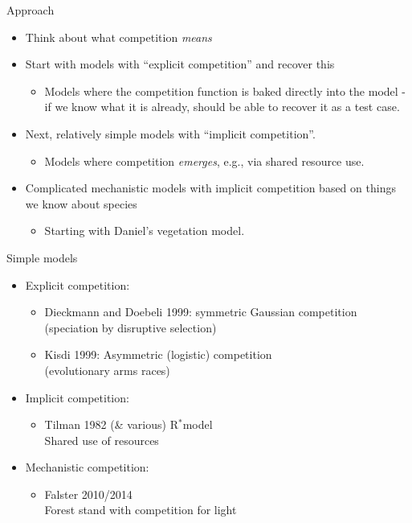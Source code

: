 \documentclass[12pt]{beamer}
\newcommand{\Rstar}{R$^*$}
\begin{document}
\begin{frame}[t]{Approach}
  \begin{itemize}
  \item Think about what competition \emph{means}
  \item Start with models with ``explicit competition'' and recover
    this
    \begin{itemize}
    \item Models where the competition function is baked directly into
      the model - if we know what it is already, should be able to
      recover it as a test case.
    \end{itemize}
  \item Next, relatively simple models with ``implicit competition''.
    \begin{itemize}
    \item Models where competition \emph{emerges}, e.g., via shared
      resource use.
    \end{itemize}
  \item Complicated mechanistic models with implicit competition based
    on things we know about species
    \begin{itemize}
    \item Starting with Daniel's vegetation model.
    \end{itemize}
  \end{itemize}
\end{frame}

\begin{frame}[t]{Simple models}
  \begin{itemize}
  \item Explicit competition:
      \begin{itemize}
      \item Dieckmann and Doebeli 1999: symmetric Gaussian competition\\
        (speciation by disruptive selection)
      \item Kisdi 1999: Asymmetric (logistic) competition\\
        (evolutionary arms races)
      \end{itemize}
  \item Implicit competition:
      \begin{itemize}
      \item Tilman 1982 (\& various) \Rstar model\\
        Shared use of resources
      \end{itemize}
  \item Mechanistic competition:
    \begin{itemize}
    \item Falster 2010/2014\\
      Forest stand with competition for light
    \end{itemize}
  \end{itemize}
\end{frame}
\end{document}
